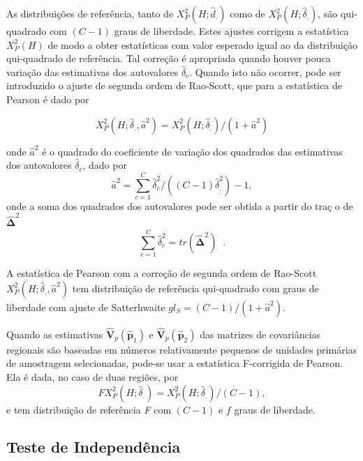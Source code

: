 \documentclass[]{book}
\numberwithin{example}{chapter}
\numberwithin{remark}{chapter}
\numberwithin{definition}{chapter}
\begin{document}
As distribuições de referência, tanto de
\(X_{P}^{2}\left( H;\hat{ d}_{\cdot }\right)\) como de
\(X_{P}^{2}\left( H;\hat{\delta}_{.}\right)\), são qui-quadrado com
\(\left( C-1\right)\) graus de liberdade. Estes ajustes corrigem a
estatística \(X_{P}^{2}\left( H\right)\) de modo a obter estatísticas
com valor esperado igual ao da distribuição qui-quadrado de referência.
Tal correção é apropriada quando houver pouca variação das estimativas
dos autovalores \(\hat{\delta} _{c}\). Quando isto não ocorrer, pode ser
introduzido o ajuste de segunda ordem de Rao-Scott, que para a
estatística de Pearson é dado por

\begin{equation}
X_{P}^{2}\left( H;\hat{\delta}_{.},\hat{a}^{2}\right) =X_{P}^{2}\left( H;
\hat{\delta}_{.}\right) /\left( 1+\hat{a}^{2}\right)  \label{eq:Tab9}
\end{equation}

onde \(\hat{a}^{2}\) é o quadrado do coeficiente de variação dos
quadrados das estimativas dos autovalores \(\hat{\delta}_{c}\), dado por
\[
\hat{a}^{2}=\sum\limits_{c=1}^{C}\hat{\delta}_{c}^{2}/\left( \left(
C-1\right) \hat{\delta}_{.}^{2}\right) -1,
\] onde a soma dos quadrados dos autovalores pode ser obtida a partir do
tra\c{c
}o de \(\mathbf{\hat{\Delta}}^{2}\) \[
\sum\limits_{c=1}^{C}\hat{\delta}_{c}^{2}=tr\left( \mathbf{\hat{\Delta}}
^{2}\right) \;\;. 
\]

A estatística de Pearson com a correção de segunda ordem de Rao-Scott
\(X_{P}^{2}\left( H;\hat{\delta}_{.},\hat{a}^{2}\right)\) tem
distribuição de referência qui-quadrado com graus de liberdade com
ajuste de Satterhwaite
\(gl_{S}=\left( C-1\right) /\left( 1+\hat{a} ^{2}\right)\).

Quando as estimativas
\(\mathbf{\hat{V}}_{p}\left( \widehat{\mathbf{p}} _{1}\right)\) e
\(\mathbf{\hat{V}}_{p}\left( \widehat{\mathbf{p}}_{2}\right)\) das
matrizes de covariâncias regionais são baseadas em números relativamente
pequenos de unidades primárias de amostragem selecionadas, pode-se usar
a estatística F-corrigida de Pearson. Ela é dada, no caso de duas
regiões, por \[
FX_{P}^{2}\left( H;\hat{\delta}_{.}\right) =X_{P}^{2}\left( H;\hat{\delta}
_{.}\right) /\left( C-1\right),
\] e tem distribuição de referência \emph{F} com \(\left(C-1\right)\) e
\(f\) graus de liberdade.

\subsection{Teste de Independência}\label{teste-de-independencia-1}
\end{document}
